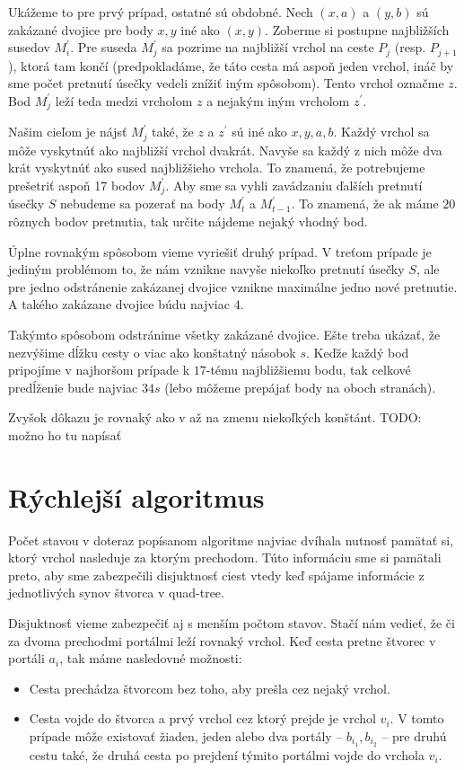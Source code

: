 \begin{dokaz}
Ukážeme to pre prvý prípad, ostatné sú obdobné. 
Nech $(x, a)$ a $(y, b)$ sú zakázané dvojice pre body $x, y$ iné ako $(x,y)$. 
Zoberme si postupne najbližších susedov $M_i^{'}$. Pre suseda $M^{'}_j$ sa pozrime na najbližší vrchol na
ceste $P_j$ (resp. $P_{j+1}$), ktorá tam končí (predpokladáme, že táto cesta má aspoň jeden vrchol, ináč by sme počet
pretnutí úsečky vedeli znížiť iným spôsobom). Tento vrchol označme $z$. Bod $M^{'}_j$ leží teda
medzi vrcholom $z$ a nejakým iným vrcholom $z^{'}$.  

Našim cieľom je nájsť $M_j^{'}$ také, že $z$ a $z^{'}$ sú iné ako $x, y, a, b$. Každý vrchol sa môže
vyskytnúť ako najbližší vrchol dvakrát. Navyše sa každý z nich môže dva krát vyskytnúť ako sused
najbližšieho vrchola. To znamená, že potrebujeme prešetriť aspoň 17 bodov $M_j^{'}$.
Aby sme sa vyhli zavádzaniu ďalších pretnutí úsečky $S$ nebudeme sa pozerať na body $M_t^{'}$ a
$M_{t-1}^{'}$. To znamená, že ak máme $20$ rôznych bodov pretnutia, tak určite nájdeme nejaký vhodný bod.

Úplne rovnakým spôsobom vieme vyriešiť druhý prípad. V treťom prípade je jediným problémom to, že
nám vznikne navyše niekoľko pretnutí úsečky $S$, ale pre jedno odstránenie zakázanej dvojice vznikne
maximálne jedno nové pretnutie. A takého zakázane dvojice búdu najviac $4$. 

Takýmto spôsobom odstránime všetky zakázané dvojice. Ešte treba ukázať, že nezvýšime dĺžku cesty
o viac ako konštatný násobok $s$. Keďže každý bod pripojíme v najhoršom prípade k $17$-tému
najbližšiemu bodu, tak celkové predĺženie bude najviac $34s$ (lebo môžeme prepájať body na oboch
stranách). 
\end{dokaz}

Zvyšok dôkazu je rovnaký ako v \cite{Arora} až na zmenu niekoľkých konštánt.
TODO: možno ho tu napísať

\section{Rýchlejší algoritmus}

Počet stavou v doteraz popísanom algoritme najviac dvíhala nutnosť pamätať si, ktorý vrchol
nasleduje za ktorým prechodom. Túto informáciu sme si pamätali preto, aby sme zabezpečili
disjuktnosť ciest vtedy keď spájame informácie z jednotlivých synov štvorca v quad-tree.

Disjuktnosť vieme zabezpečiť aj s menším počtom stavov.
Stačí nám vedieť, že či za dvoma prechodmi portálmi leží rovnaký vrchol.
Keď cesta pretne štvorec v portáli $a_i$, tak máme nasledovné možnosti:
\begin{itemize}
\item Cesta prechádza štvorcom bez toho, aby prešla cez nejaký vrchol.
\item Cesta vojde do štvorca a prvý vrchol cez ktorý prejde je vrchol $v_i$.
V tomto prípade môže existovať žiaden, jeden alebo dva portály -- $b_{i_1}, b_{i_2}$ --
pre druhú cestu také, že druhá cesta po prejdení týmito portálmi vojde
do vrchola $v_i$.
\end{itemize}

